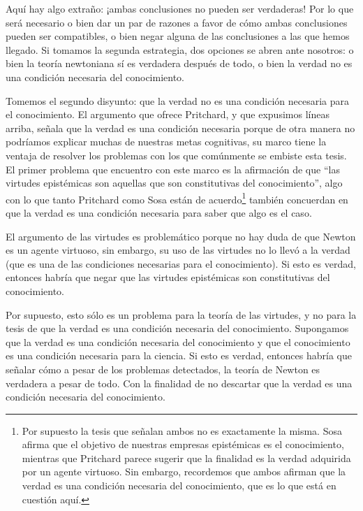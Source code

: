 \documentclass[12pt]{article}
\begin{document}
Aquí hay algo extraño: ¡ambas conclusiones no pueden ser verdaderas! Por lo que será necesario o bien dar un par de razones a favor de cómo ambas conclusiones pueden ser compatibles, o bien negar alguna de las conclusiones a las que hemos llegado. Si tomamos la segunda estrategia, dos opciones se abren ante nosotros: o bien la teoría newtoniana sí es verdadera después de todo, o bien la verdad no es una condición necesaria del conocimiento.

Tomemos el segundo disyunto: que la verdad no es una condición necesaria para el conocimiento. El argumento que ofrece Pritchard, y que expusimos líneas arriba, señala que la verdad es una condición necesaria porque de otra manera no podríamos explicar muchas de nuestras metas cognitivas, su marco tiene la ventaja de resolver los problemas con los que comúnmente se embiste esta tesis. El primer problema que encuentro con este marco es la afirmación de que ``las virtudes epistémicas son aquellas que son constitutivas del conocimiento'', algo con lo que tanto Pritchard como Sosa están de acuerdo\footnote{Por supuesto la tesis que señalan ambos no es exactamente la misma. Sosa afirma que el objetivo de nuestras empresas epistémicas es el conocimiento, mientras que Pritchard parece sugerir que la finalidad  es la verdad adquirida por un agente virtuoso. Sin embargo, recordemos que ambos afirman que la verdad es una condición necesaria del conocimiento, que es lo que está en cuestión aquí. } también concuerdan en que la verdad es una condición necesaria para saber que algo es el caso.

El argumento de las virtudes es  problemático porque no  hay duda de que Newton es un agente virtuoso, sin embargo, su uso de las virtudes no lo llevó a la verdad (que es una de las condiciones necesarias para el conocimiento). Si esto es verdad,  entonces habría que negar que las virtudes epistémicas son constitutivas del conocimiento.


Por supuesto, esto sólo es un problema para la teoría de las virtudes, y no para la tesis de que la verdad es una condición necesaria del conocimiento. Supongamos que la verdad es una condición necesaria del conocimiento y que el conocimiento es una condición necesaria para la ciencia. Si esto es verdad, entonces habría que señalar cómo a pesar de los problemas detectados, la teoría de Newton es verdadera a pesar de todo. Con la finalidad de no descartar que la verdad es una condición necesaria del conocimiento.
\end{document}
